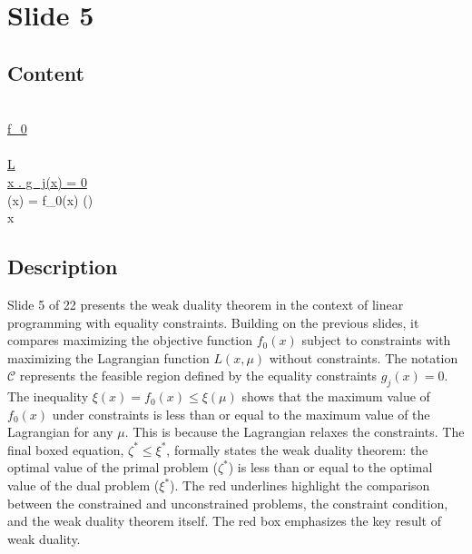 \documentclass{article}%
\begin{document}
%
\newpage%
\section{Slide 5}%
\label{sec:Slide5}%
\subsection{Content}%

 \\
\underline{ \max f_0 } \\
 \\
\underline{ L } \\
\underline{ x \in {}.  g_j(x) = 0} \\
\xi(x) = f_0(x) \le \xi(\mu) \\
 x  \qquad {} \mu \\
%
\subsection{Description}%
Slide 5 of 22 presents the weak duality theorem in the context of linear programming with equality constraints. Building on the previous slides, it compares maximizing the objective function $f_0(x)$ subject to constraints with maximizing the Lagrangian function $L(x,\mu)$ without constraints.  The notation $\mathcal{C}$ represents the feasible region defined by the equality constraints $g_j(x) = 0$. The inequality $\xi(x) = f_0(x) \le \xi(\mu)$ shows that the maximum value of $f_0(x)$ under constraints is less than or equal to the maximum value of the Lagrangian for any $\mu$.  This is because the Lagrangian relaxes the constraints. The final boxed equation, $\zeta^* \le \xi^*$, formally states the weak duality theorem: the optimal value of the primal problem ($\zeta^*$) is less than or equal to the optimal value of the dual problem ($\xi^*$).  The red underlines highlight the comparison between the constrained and unconstrained problems, the constraint condition, and the weak duality theorem itself. The red box emphasizes the key result of weak duality.%
\end{document}

